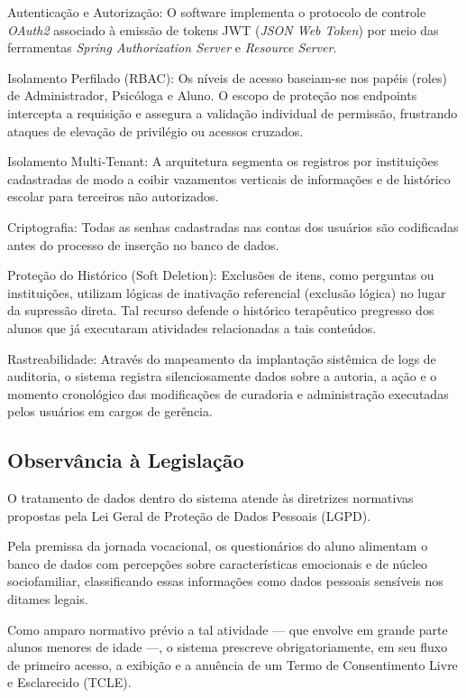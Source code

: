Autenticação e Autorização: O software implementa o protocolo de controle \textit{OAuth2} associado à emissão de tokens JWT (\textit{JSON Web Token}) por meio das ferramentas \textit{Spring Authorization Server} e \textit{Resource Server}.

Isolamento Perfilado (RBAC): Os níveis de acesso baseiam-se nos papéis (roles) de Administrador, Psicóloga e Aluno. O escopo de proteção nos endpoints intercepta a requisição e assegura a validação individual de permissão, frustrando ataques de elevação de privilégio ou acessos cruzados.

Isolamento Multi-Tenant: A arquitetura segmenta os registros por instituições cadastradas de modo a coibir vazamentos verticais de informações e de histórico escolar para terceiros não autorizados.

Criptografia: Todas as senhas cadastradas nas contas dos usuários são codificadas antes do processo de inserção no banco de dados.

Proteção do Histórico (Soft Deletion): Exclusões de itens, como perguntas ou instituições, utilizam lógicas de inativação referencial (exclusão lógica) no lugar da supressão direta. Tal recurso defende o histórico terapêutico pregresso dos alunos que já executaram atividades relacionadas a tais conteúdos.

Rastreabilidade: Através do mapeamento da implantação sistêmica de logs de auditoria, o sistema registra silenciosamente dados sobre a autoria, a ação e o momento cronológico das modificações de curadoria e administração executadas pelos usuários em cargos de gerência.

\subsection{Observância à Legislação}

O tratamento de dados dentro do sistema atende às diretrizes normativas propostas pela Lei Geral de Proteção de Dados Pessoais (LGPD).

Pela premissa da jornada vocacional, os questionários do aluno alimentam o banco de dados com percepções sobre características emocionais e de núcleo sociofamiliar, classificando essas informações como dados pessoais sensíveis nos ditames legais.

Como amparo normativo prévio a tal atividade — que envolve em grande parte alunos menores de idade —, o sistema prescreve obrigatoriamente, em seu fluxo de primeiro acesso, a exibição e a anuência de um Termo de Consentimento Livre e Esclarecido (TCLE).


